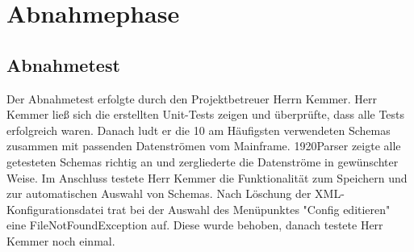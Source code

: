 \section{Abnahmephase} 
\label{sec:Abnahmephase}
\subsection{Abnahmetest}
\label{sec:Abnahmetest}
Der Abnahmetest erfolgte durch den Projektbetreuer Herrn Kemmer. Herr Kemmer ließ sich die erstellten Unit-Tests zeigen und überprüfte, dass alle Tests erfolgreich waren. Danach ludt er die 10 am Häufigsten verwendeten Schemas zusammen mit passenden Datenströmen vom Mainframe. 1920Parser zeigte alle getesteten Schemas richtig an und zergliederte die Datenströme in gewünschter Weise. Im Anschluss testete Herr Kemmer die Funktionalität zum Speichern und zur automatischen Auswahl von Schemas. Nach Löschung der XML-Konfigurationsdatei trat bei der Auswahl des Menüpunktes "Config editieren" eine FileNotFoundException auf. Diese wurde behoben, danach testete Herr Kemmer noch einmal.

